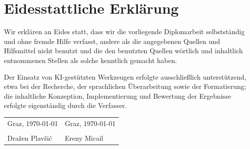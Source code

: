 \chapter*{Eidesstattliche Erklärung}

Wir erklären an Eides statt, dass wir die vorliegende Diplomarbeit selbstständig und ohne
fremde Hilfe verfasst, andere als die angegebenen Quellen und Hilfsmittel nicht benutzt
und die den benutzten Quellen wörtlich und inhaltlich entnommenen Stellen als solche
kenntlich gemacht haben.

Der Einsatz von KI-gestützten Werkzeugen erfolgte ausschließlich unterstützend, etwa bei
der Recherche, der sprachlichen Überarbeitung sowie der Formatierung; die inhaltliche
Konzeption, Implementierung und Bewertung der Ergebnisse erfolgte eigenständig durch die
Verfasser.

\vspace{2cm}

\noindent
\begin{tabular}{@{}p{7cm}p{7cm}@{}}
Graz, \today & Graz, \today \\[2cm]
\hrulefill & \hrulefill \\
Dražen Plavšić & Ereny Micail \\
\end{tabular}
